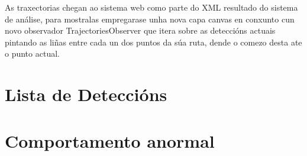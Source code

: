     As traxectorias chegan ao sistema web como parte do XML resultado do sistema de análise, para 
    mostralas empregarase unha nova capa canvas en conxunto cun novo observador 
    TrajectoriesObserver que itera sobre as deteccións actuais pintando as liñas entre cada un dos
    puntos da súa ruta, dende o comezo desta ate o punto actual.
    
    
\section{Lista de Deteccións}



\section{Comportamento anormal}
